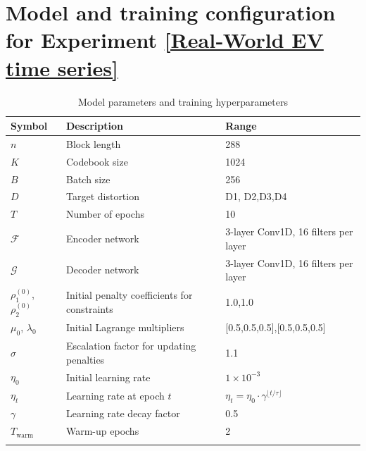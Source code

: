 \documentclass[12pt,review,authoryear]{elsarticle}
\theoremstyle{upright}
\begin{document}
\section{  Model and training configuration for Experiment \ref{Real‐World EV time series}}
\label{Model and training configuration for Experiment 2}
\begin{table}[H]
\centering
\caption{Model parameters and training hyperparameters}
\begin{tabular}{lll}
\toprule
\textbf{Symbol} & \textbf{Description} & \textbf{Range} \\
\midrule
\(n\) & Block length & 288 \\
\(K\) & Codebook size & 1024 \\
\(B\) & Batch size & 256\\
\(D\) & Target distortion & {D1, D2,D3,D4}  \\
\(T\) & Number of epochs & 10 \\
\(\mathcal{F}\) & Encoder network & 3-layer Conv1D, 16 filters per layer \\
\(\mathcal{G}\) & Decoder network & 3-layer Conv1D, 16 filters per layer \\
\(\rho_1^{(0)}\), \(\rho_2^{(0)}\) & Initial penalty coefficients for constraints & 1.0,1.0 \\
\(\mu_0\), \(\lambda_0\) & Initial Lagrange multipliers& [0.5,0.5,0.5],[0.5,0.5,0.5] \\
\(\sigma\) & Escalation factor for updating penalties & 1.1 \\
\(\eta_0\) & Initial learning rate & \(1 \times 10^{-3}\) \\
\(\eta_t\) & Learning rate at epoch \(t\) & \(\eta_t = \eta_0 \cdot \gamma^{\lfloor t / \tau \rfloor}\) \\
\(\gamma\) & Learning rate decay factor & 0.5 \\

\(T_{\text{warm}}\) & Warm-up epochs & 2 \\
 \\

\bottomrule
\end{tabular}
\label{tab:hyperparams}
\end{table}
\end{document}
